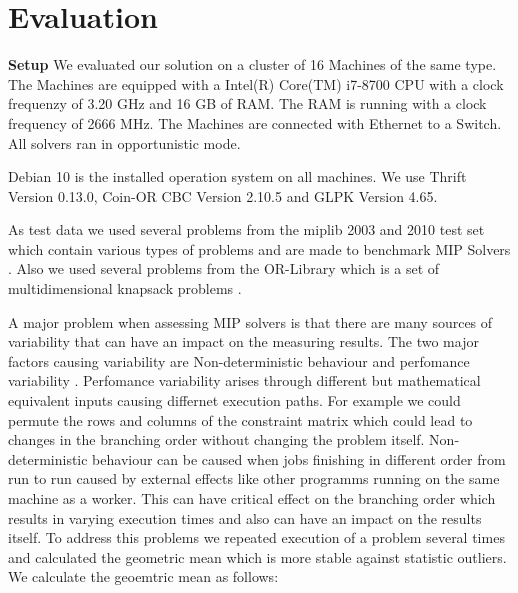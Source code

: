 \documentclass[sigconf]{acmart}
\begin{document}
\section{Evaluation}

\textbf{Setup}
We evaluated our solution on a cluster of 16 Machines of the same type. The Machines are equipped with a Intel(R) Core(TM) i7-8700 CPU with a clock frequenzy of 3.20 GHz and 16 GB of RAM. The RAM is running with a clock frequency of 2666 MHz. The Machines are connected with Ethernet to a Switch. All solvers ran in opportunistic mode.

Debian 10 is the installed operation system on all machines. We use Thrift Version 0.13.0, Coin-OR CBC Version 2.10.5 and GLPK Version 4.65.  

As test data we used several problems from the miplib 2003 and 2010 test set which contain various types of problems and are made to benchmark MIP Solvers \cite{koch2011miplib}. Also we used several problems from the OR-Library  which is a set of multidimensional knapsack problems \cite{chu1998genetic}. 

A major problem when assessing MIP solvers is that there are many sources of variability that can have an impact on the measuring results. The two major factors causing variability are Non-deterministic behaviour and perfomance variability \cite{maher2019assessing}. Perfomance variability arises through different but mathematical equivalent inputs causing differnet execution paths. For example we could permute the rows and columns of the constraint matrix which could lead to changes in the branching order without changing the problem itself. Non-deterministic behaviour can be caused when jobs finishing in different order from run to run caused by external effects like other programms running on the same machine as a worker. This can have critical effect on the branching order which results in varying execution times and also can have an impact on the results itself. To address this problems we repeated execution of a problem several times and calculated the geometric mean which is more stable against statistic outliers. We calculate the geoemtric mean as follows:
\end{document}
